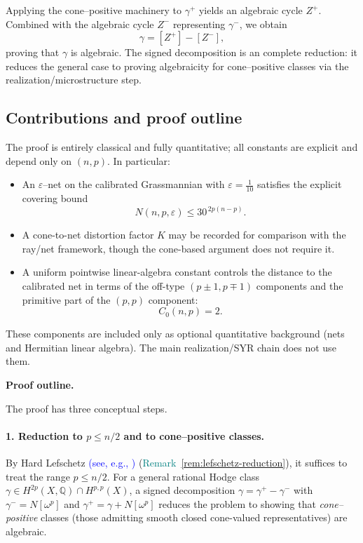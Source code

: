 \documentclass[11pt]{article}
\newcommand{\REV}[1]{\textcolor{blue}{#1}}
\newcommand{\REVMZ}[1]{\textcolor{teal}{#1}}  %
\numberwithin{equation}{section}  %
\theoremstyle{plain}
\theoremstyle{definition}
\theoremstyle{remark}
\newcommand{\Q}{\mathbb{Q}}
\begin{document}
Applying the cone--positive machinery to $\gamma^{+}$ yields an algebraic
cycle $Z^{+}$.  Combined with the algebraic cycle $Z^{-}$ representing
$\gamma^{-}$, we obtain
\[
\gamma = [Z^{+}] - [Z^{-}],
\]
proving that $\gamma$ is algebraic.  The signed decomposition is an complete reduction:
it reduces the general case to proving algebraicity for cone--positive classes via the
realization/microstructure step.

\subsection*{Contributions and proof outline}

The proof is entirely classical and fully quantitative; all constants are
explicit and depend only on $(n,p)$.  In particular:

\begin{itemize}
	\item An $\varepsilon$--net on the calibrated Grassmannian with
	$\varepsilon = \tfrac{1}{10}$ satisfies the explicit covering bound
	\[
	N(n,p,\varepsilon) \le 30^{\,2p(n-p)}.
	\]
	
	\item A cone-to-net distortion factor $K$ may be recorded for comparison with the
	ray/net framework, though the cone-based argument does not require it.
	
	\item A uniform pointwise linear-algebra constant controls the distance to the
	calibrated net in terms of the off-type $(p\pm1,p\mp1)$ components and the
	primitive part of the $(p,p)$ component:
	\[
	C_{0}(n,p) = 2.
	\]
\end{itemize}


These components are included only as optional quantitative background (nets and Hermitian linear algebra).
The main realization/SYR chain does not use them.


\medskip\noindent\textbf{Proof outline.}

The proof has three conceptual steps.

\paragraph{1. Reduction to $p\le n/2$ and to cone--positive classes.}
By Hard Lefschetz \REV{(see, e.g., \cite{Voisin02,GH78,Wells})} (\REVMZ{Remark~\ref{rem:lefschetz-reduction}}), it suffices to treat the range $p\le n/2$.
For a general rational Hodge class $\gamma\in H^{2p}(X,\Q)\cap H^{p,p}(X)$, a signed decomposition
$\gamma=\gamma^+-\gamma^-$ with $\gamma^- = N[\omega^p]$ and $\gamma^+=\gamma+N[\omega^p]$
reduces the problem to showing that \emph{cone--positive} classes (those admitting smooth closed cone-valued representatives) are algebraic.
\end{document}
